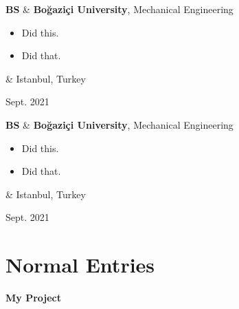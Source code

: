 \documentclass[10pt, letterpaper]{article}
\newenvironment{highlights}{
        \begin{itemize}[
                topsep=0pt,
                parsep=0.10 cm,
                partopsep=0pt,
                itemsep=0pt,
                after=\relax,
                leftmargin=0.4 cm + 3pt
            ]
    }{
        \end{itemize}
    } %
\let\originalTabularx\tabularx
\let\originalEndTabularx\endtabularx
\renewenvironment{tabularx}{\bgroup\centering\originalTabularx}{\originalEndTabularx\par\egroup}
\begin{document}
        \vspace{0.2 cm}
        \begin{tabularx}{
            \textwidth-0.4 cm-0.13cm
        }{
            L{0.85cm}
            K{0.2 cm}
            R{4.1 cm}
        }
            \textbf{BS}
            &
            \textbf{Boğaziçi University}, Mechanical Engineering

            \vspace{0.10 cm}

            \begin{highlights}
                \item Did this.
                \item Did that.
            \end{highlights}
            &
            Istanbul, Turkey

            Sept. 2021
        \end{tabularx}

        \vspace{0.2 cm}
        \begin{tabularx}{
            \textwidth-0.4 cm-0.13cm
        }{
            L{0.85cm}
            K{0.2 cm}
            R{4.1 cm}
        }
            \textbf{BS}
            &
            \textbf{Boğaziçi University}, Mechanical Engineering

            \vspace{0.10 cm}

            \begin{highlights}
                \item Did this.
                \item Did that.
            \end{highlights}
            &
            Istanbul, Turkey

            Sept. 2021
        \end{tabularx}


    
    \section{Normal Entries}

        \begin{tabularx}{
            \textwidth-0.4 cm-0.13cm
        }{
            K{0.2 cm}
        }
            \textbf{My Project}

            \vspace{0.10 cm}

        \end{tabularx}
\end{document}

